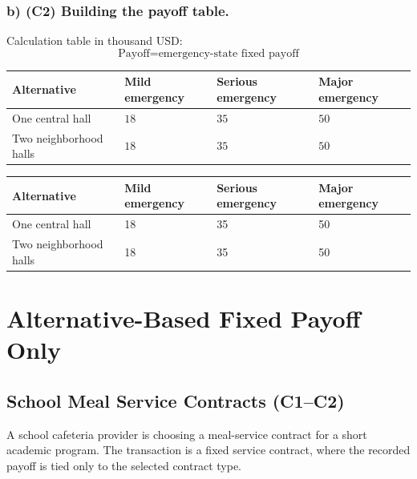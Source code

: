 	
	\subsubsection*{b) \textbf{(C2)} Building the payoff table.}
	\label{subsec:problem8-community-hall-emergency-rentals-c2}
	Calculation table in thousand USD:
	\[
	\text{Payoff}=\text{emergency-state fixed payoff}
	\]
	\begin{center}
		\begin{tabular}{llll}
			\toprule
			Alternative & Mild emergency & Serious emergency & Major emergency \\
			\midrule
			One central hall & $18$ & $35$ & $50$ \\
			Two neighborhood halls & $18$ & $35$ & $50$ \\
			\bottomrule
		\end{tabular}
	\end{center}
	
	\begin{center}
		\begin{tabular}{llll}
			\toprule
			Alternative & Mild emergency & Serious emergency & Major emergency \\
			\midrule
			One central hall & 18 & 35 & 50 \\
			Two neighborhood halls & 18 & 35 & 50 \\
			\bottomrule
		\end{tabular}
	\end{center}
	
	
	\section{Alternative-Based Fixed Payoff Only}
	\label{sec:alternative-based-fixed-payoff-only}
	
	
	\subsection{School Meal Service Contracts (C1--C2)}
	\label{sec:problem16-school-meal-service-contracts-c1-c2}
	A school cafeteria provider is choosing a meal-service contract for a short academic program. The transaction is a fixed service contract, where the recorded payoff is tied only to the selected contract type.
	
